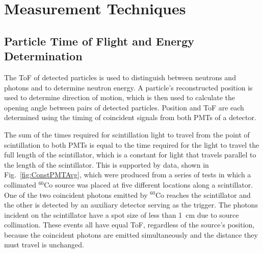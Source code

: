 \section{Measurement Techniques}
\subsection{Particle Time of Flight and Energy Determination}
\label{ToF_reconstruction}
The ToF of detected particles is used to distinguish between neutrons and photons and to determine neutron energy.
A particle's reconstructed position is used to determine direction of motion, which is then used to calculate the opening angle between pairs of detected particles.
Position and ToF are each determined using the timing of coincident signals from both PMTs of a detector.

The sum of the times required for scintillation light to travel from the point of scintillation to both PMTs is equal to the time required for the light to travel the full length of the scintillator, which is a constant for light that travels parallel to the length of the scintillator.
This is supported by data, shown in Fig.~\ref{fig:ConstPMTAvg}, which were produced from a series of tests in which a collimated $^{60}$Co source was placed at five different locations along a scintillator.
One of the two coincident photons emitted by $^{60}$Co reaches the scintillator and the other is detected by an auxiliary detector serving as the trigger. 
The photons incident on the scintillator have a spot size of less than 1~cm due to source collimation.
These events all have equal ToF, regardless of the source's position, because the coincident photons are emitted simultaneously and the distance they must travel is unchanged. 

